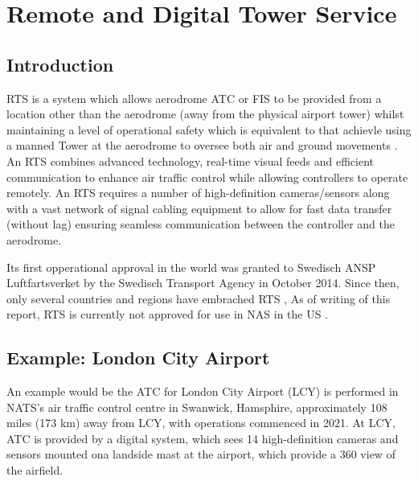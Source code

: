 \section{Remote and Digital Tower Service}

\subsection{Introduction}

\gls{RTS} is a system which allows aerodrome \gls{ATC} or \gls{FIS} to be provided from a location other than the aerodrome (away from the physical airport tower) whilst maintaining a level of operational safety which is equivalent to that achievle using a manned Tower at the aerodrome to oversee both air and ground movements \cite{skybrary_rts}. 
An RTS combines advanced technology, real-time visual feeds and efficient communication to enhance air traffic control while allowing controllers to operate remotely.
An RTS requires a number of high-definition cameras/sensors along with a vast network of signal cabling equipment to allow for fast data transfer (without lag) ensuring seamless communication between the controller and the aerodrome.


Its first opperational approval in the world was granted to Swedisch ANSP Luftfartsverket by the Swedisch Transport Agency in October 2014.
Since then, only several countries and regions have embrached \gls{RTS} \cite{globalaero2024remote}, 
As of writing of this report, \gls{RTS} is currently not approved for use in \gls{NAS} in the US \cite{faa_remote_tower}.


\subsection{Example: London City Airport \cite{lcy2022digital}}
An example would be the \gls{ATC} for London City Airport (LCY) is performed in NATS's air traffic control centre in Swanwick, Hamsphire, approximately 108 miles (173 km) away from LCY, with operations commenced in 2021. 
At LCY, \gls{ATC} is provided by a digital system, which sees 14 high-definition cameras and sensors mounted ona landside mast at the airport, which provide a 360 \textdegree view of the airfield. 




